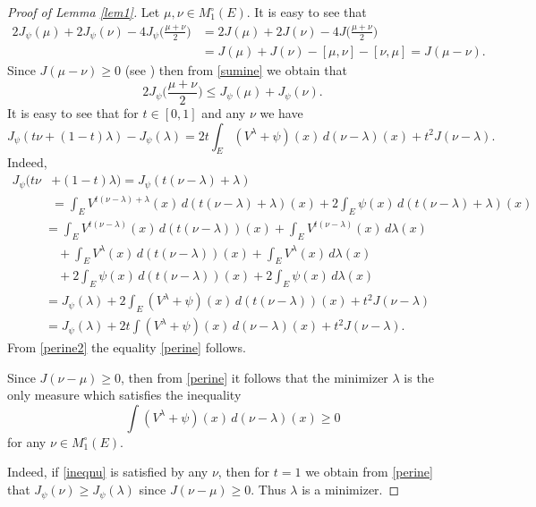 \documentclass[11pt, a4paper, twoside]{article}
\let\leq\leqslant
\let\geq\geqslant
\theoremstyle{plain}
\theoremstyle{definition}
\begin{document}
\begin{proof}[Proof of Lemma \ref{lem1}]
Let $\mu,\nu\in M_1^\circ(E)$. It is easy to see that
\begin{align}
2J_\psi(\mu)+2J_\psi(\nu)-4J_\psi\biggl(\frac{\mu+\nu}2\biggr)
&=2J(\mu)+2J(\nu)-4J\biggl(\frac{\mu+\nu}2\biggr)\label{sumine}\\
&=J(\mu)+J(\nu)-[\mu,\nu]-[\nu,\mu]=J(\mu-\nu).\nonumber
\end{align}
Since $J(\mu-\nu)\geq0$ (see \cite{Chi19}) then from \eqref{sumine} we obtain that
\begin{equation}
2J_\psi\biggl(\frac{\mu+\nu}2\biggr)\leq J_\psi(\mu)
+J_\psi(\nu).
\label{sumneq}
\end{equation}
It is easy to see that for $t\in[0,1]$ and any $\nu$ we have
\begin{equation}
J_\psi(t\nu+(1-t)\lambda)-J_\psi(\lambda)
=2t\int_E(V^\lambda+\psi)(x)\,d(\nu-\lambda)(x)
+t^2J(\nu-\lambda).
\label{perine}
\end{equation}
Indeed,
\begin{align}
J_\psi(t\nu&+(1-t)\lambda)=J_\psi(t(\nu-\lambda)+\lambda)\nonumber\\
&=\int_EV^{t(\nu-\lambda)+\lambda}(x)\,d(t(\nu-\lambda)+\lambda)(x)
+2\int_E\psi(x)\,d(t(\nu-\lambda)+\lambda)(x)\nonumber
\end{align}
\begin{align}
&=\int_EV^{t(\nu-\lambda)}(x)\,d(t(\nu-\lambda))(x)
+\int_E V^{t(\nu-\lambda)}(x)\,d\lambda(x)\nonumber\\
&\quad
+\int_EV^\lambda(x)\,d(t(\nu-\lambda))(x)
+\int_E V^\lambda(x)\,d\lambda(x)\nonumber\\
&\quad+2\int_E\psi(x)\,d(t(\nu-\lambda))(x)+2\int_E\psi(x)\,d\lambda(x)
\nonumber\\
&=J_\psi(\lambda)+2\int_E(V^\lambda+\psi)(x)\,d(t(\nu-\lambda))(x)
+t^2J(\nu-\lambda)\nonumber\\
&=J_\psi(\lambda)+2t\int(V^\lambda+\psi)(x)\,d(\nu-\lambda)(x)
+t^2J(\nu-\lambda).
\label{perine2}
\end{align}
From \eqref{perine2} the equality \eqref{perine} follows.

Since $J(\nu-\mu)\geq0$, then from \eqref{perine} it follows that the minimizer $\lambda$ is the only measure which satisfies the inequality 
\begin{equation}
\int(V^\lambda+\psi)(x)\,d(\nu-\lambda)(x)\geq0
\label{ineqnu}
\end{equation}
for any $\nu\in M_1^\circ(E)$. 

Indeed, if \eqref{ineqnu} is satisfied by any $\nu$, then for $t=1$ we obtain from \eqref{perine} that $J_\psi(\nu)\geq J_\psi(\lambda)$ since $J(\nu-\mu)\geq0$. Thus $\lambda$ is a minimizer.


\end{proof}
\end{document}
